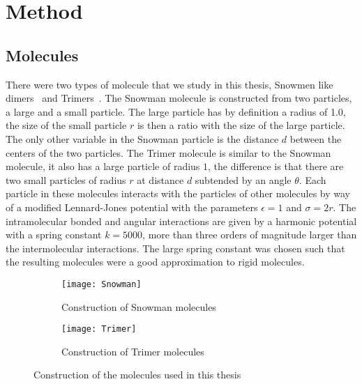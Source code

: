 
\chapter{Method}

\section{Molecules}

There were two types of molecule that we study in this thesis, Snowmen like dimers~ and Trimers~. The Snowman molecule is constructed from two particles, a large and a small particle. The large particle has by definition a radius of \num{1.0}, the size of the small particle $r$ is then a ratio with the size of the large particle. The only other variable in the Snowman particle is the distance $d$ between the centers of the two particles. The Trimer molecule is similar to the Snowman molecule, it also has a large particle of radius $1$, the difference is that there are two small particles of radius $r$ at distance $d$ subtended by an angle $\theta$. Each particle in these molecules interacts with the particles of other molecules by way of a modified Lennard-Jones potential with the parameters $\epsilon = 1$ and $\sigma = 2r$. The intramolecular bonded and angular interactions are given by a harmonic potential with a spring constant $k=5000$, more than three orders of magnitude larger than the intermolecular interactions. The large spring constant was chosen such that the resulting molecules were a good approximation to rigid molecules.

\begin{figure}
    \begin{subfigure}{0.5\textwidth}
        \centering
        \texttt{[image: Snowman]}
        \caption{Construction of Snowman molecules}
        \label{fig:snowman}
    \end{subfigure}
    \begin{subfigure}{0.5\textwidth}
        \centering
        \texttt{[image: Trimer]}
        \caption{Construction of Trimer molecules}
        \label{fig:trimer}
    \end{subfigure}
    \caption{Construction of the molecules used in this thesis}
    \label{fig:construction}
\end{figure}

